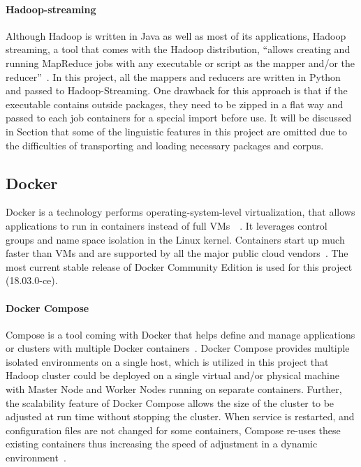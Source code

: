 \paragraph{Hadoop-streaming} Although Hadoop is written in Java as well 
as most of its applications, Hadoop streaming, a tool that comes with the 
Hadoop distribution, ``allows creating and running MapReduce jobs with any 
executable or script as the mapper and/or the 
reducer''~\cite{hid-sp18-405-hadoop-streaming}. In this project, all the 
mappers and reducers are written in Python and passed to 
Hadoop-Streaming. One drawback for this approach is that if the executable 
contains outside packages, they need to be zipped in a flat way and passed 
to each job containers for a special import before use. 
It will be discussed in Section\label{s:algorithm} that some of the linguistic 
features in this project are omitted due to the difficulties of transporting and 
loading necessary packages and corpus. 


\subsection{Docker}
Docker is a technology performs operating-system-level virtualization, that 
allows applications to run in containers instead of full 
VMs~\cite{hid-sp18-405-docker-wiki}~\cite{las18handbook}. It leverages 
control groups and name space
isolation in the Linux kernel. Containers start up much faster than
VMs and are supported by all the major public cloud
vendors~\cite{Foster:2017:CCS:3158276}. The most current stable
release of Docker Community Edition is used for this project
(18.03.0-ce).

\paragraph{Docker Compose} Compose is a tool coming with Docker that 
helps define and manage applications or clusters with multiple Docker 
containers~\cite{hid-sp18-405-docker-compose-doc}. Docker Compose 
provides multiple isolated environments on a single host, which is utilized in 
this project that Hadoop cluster could be deployed on a single virtual and/or 
physical machine with Master Node and Worker Nodes running on separate 
containers. Further, the scalability feature of Docker Compose allows the size 
of the cluster to be adjusted at run time without stopping the cluster. When 
service is restarted, and configuration files are not changed for some 
containers, Compose re-uses these existing containers thus increasing the 
speed of adjustment in a dynamic 
environment~\cite{hid-sp18-405-docker-compose-doc}.

